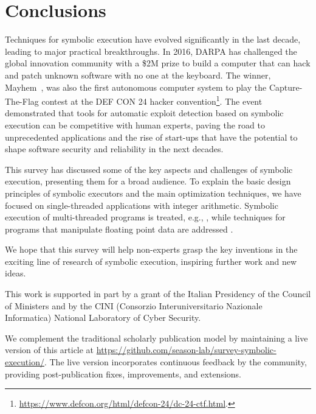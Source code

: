
\vspace{-2pt} %
\section{Conclusions}
\label{se:conclusions}

Techniques for symbolic execution have evolved significantly in the last decade, leading to major practical breakthroughs. In 2016, DARPA has challenged the global innovation community with a \$2M prize to build a computer that can hack and patch unknown software with no one at the keyboard. The winner, {\sc Mayhem}~\cite{MAYHEM-SP12}, was also the first autonomous computer system to play the Capture-The-Flag contest at the DEF CON 24 hacker convention\footnote{\url{https://www.defcon.org/html/defcon-24/dc-24-ctf.html}.}. The event demonstrated that tools for automatic exploit detection based on symbolic execution can be competitive with human experts, paving the road to unprecedented applications and the rise of start-ups that have the potential to shape software security and reliability in the next decades. 

This survey has discussed some of the key aspects and challenges of symbolic execution, presenting them for a broad audience. To explain the basic design principles of symbolic executors and the main optimization techniques, we have focused on single-threaded applications with integer arithmetic. Symbolic execution of multi-threaded programs is treated, e.g., , while techniques for programs that manipulate floating point data are addressed .

We hope that this survey will help non-experts grasp the key inventions in the exciting line of research of symbolic execution, inspiring further work and new ideas.

\ifdefined\arxivver

This work is supported in part by a grant of the Italian Presidency of the Council of Ministers and by the CINI (Consorzio Interuniversitario Nazionale Informatica) National Laboratory of Cyber Security.

We complement the traditional scholarly publication model by maintaining a live version of this article at {\href{https://github.com/season-lab/survey-symbolic-execution}{https://github.com/season-lab/survey-symbolic-execution/}}. The live version incorporates continuous feedback by the community, providing post-publication fixes, improvements, and extensions.
\fi
